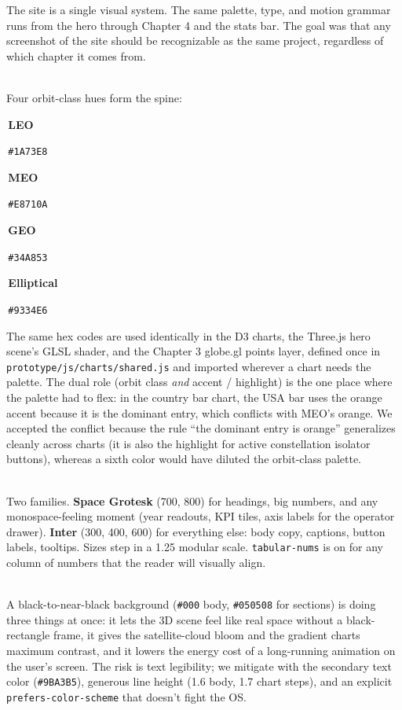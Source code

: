 \documentclass[9pt,a4paper]{article}
\newcommand{\hexchip}[2]{%
  \colorbox{#1}{\color{white}\strut\,\footnotesize\textbf{#2}\,}%
}
\newcommand{\subhead}[1]{%
  \vspace{4pt}%
  \noindent\tcbox[
    on line,
    colback=accentBlue!10!white, colframe=accentBlue,
    boxrule=0.3pt, arc=2.5pt,
    left=7pt, right=7pt, top=0.5pt, bottom=0.5pt,
  ]{\small\bfseries\color{accentBlue!85!black}#1}\\[2pt]%
}
\begin{document}
The site is a single visual system. The same palette, type, and motion grammar runs from the hero through Chapter 4 and the stats bar. The goal was that any screenshot of the site should be recognizable as the same project, regardless of which chapter it comes from.

\vspace{2pt}

\subhead{Color}

Four orbit-class hues form the spine:

\vspace{2pt}
\begin{center}
\hexchip{accentBlue}{LEO}\,\texttt{\footnotesize\#1A73E8}\quad
\hexchip{accentOrange}{MEO}\,\texttt{\footnotesize\#E8710A}\quad
\hexchip{accentGreen}{GEO}\,\texttt{\footnotesize\#34A853}\quad
\hexchip{accentPurple}{Elliptical}\,\texttt{\footnotesize\#9334E6}
\end{center}
\vspace{2pt}

The same hex codes are used identically in the D3 charts, the Three.js hero scene's GLSL shader, and the Chapter 3 globe.gl points layer, defined once in \texttt{prototype/js/charts/shared.js} and imported wherever a chart needs the palette. The dual role (orbit class \textit{and} accent / highlight) is the one place where the palette had to flex: in the country bar chart, the USA bar uses the orange accent because it is the dominant entry, which conflicts with MEO's orange. We accepted the conflict because the rule ``the dominant entry is orange'' generalizes cleanly across charts (it is also the highlight for active constellation isolator buttons), whereas a sixth color would have diluted the orbit-class palette.

\vspace{2pt}

\subhead{Typography}

Two families. \textbf{Space Grotesk} (700, 800) for headings, big numbers, and any monospace-feeling moment (year readouts, KPI tiles, axis labels for the operator drawer). \textbf{Inter} (300, 400, 600) for everything else: body copy, captions, button labels, tooltips. Sizes step in a 1.25 modular scale. \texttt{tabular-nums} is on for any column of numbers that the reader will visually align.

\vspace{2pt}

\subhead{Dark theme}

A black-to-near-black background (\texttt{\#000} body, \texttt{\#050508} for sections) is doing three things at once: it lets the 3D scene feel like real space without a black-rectangle frame, it gives the satellite-cloud bloom and the gradient charts maximum contrast, and it lowers the energy cost of a long-running animation on the user's screen. The risk is text legibility; we mitigate with the secondary text color (\texttt{\#9BA3B5}), generous line height (1.6 body, 1.7 chart steps), and an explicit \texttt{prefers-color-scheme} that doesn't fight the OS.
\end{document}
